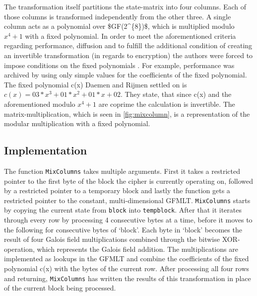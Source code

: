 The transformation itself partitions the
state-matrix into four columns. Each of those columns is transformed
independently from the other three. A single column acts as a polynomial
over \ac{$GF(2^{8})$}, which is multiplied modulo $x^4 + 1$ with a fixed polynomial. In
order to meet the aforementioned criteria regarding performance,
diffusion and to fulfill the additional condition of creating an
invertible transformation (in regards to encryption) the authors were
forced to impose conditions on the fixed polynomials \cite[p. 39]{rijndael}. For
example, performance was archived by using only simple values for the
coefficients of the fixed polynomial. The fixed polynomial c(x) Daemen
and Rijmen settled on is $c(x) = 03 * x^3 + 01 * x^2 + 01 * x + 02$. They
state, that since c(x) and the aforementioned modulo $x^4+1$ are coprime
the calculation is invertible. The matrix-multiplication, which is seen
in \ref{fig:mixcolumn}, is a representation of the modular multiplication with a
fixed polynomial.

\hypertarget{implementation-4}{%
\subsection{Implementation}\label{implementation-4}}

The function \lstinline|MixColumns| takes multiple arguments. First it takes a
restricted pointer to the first byte of the block the cipher is
currently operating on, followed by a restricted pointer to a temporary
block and lastly the function gets a restricted pointer to the constant,
multi-dimensional \ac{GFMLT}. \lstinline|MixColumns| starts by copying the current state
from \lstinline|block| into \lstinline|tempblock|. After that it iterates through every row
by processing 4 consecutive bytes at a time, before it moves to the
following for consecutive bytes of `block'. Each byte in `block' becomes
the result of four Galois field multiplications combined through the
bitwise \ac{XOR}-operation, which represents the Galois field addition. The
multiplications are implemented as lookups in the \ac{GFMLT} and combine the
coefficients of the fixed polynomial c(x) with the bytes of the current
row. After processing all four rows and returning, \lstinline|MixColumns| has
written the results of this transformation in place of the current block
being processed.

